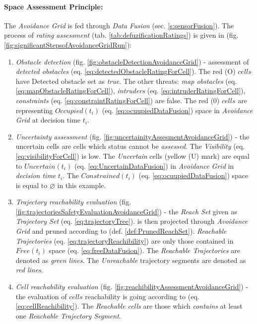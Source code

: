 \paragraph{Space Assessment Principle:} The \emph{Avoidance Grid} is fed through \emph{Data Fusion} (sec. \ref{s:sensorFusion}). The process of \emph{rating assessment} (tab. \ref{tab:defuzificationRatings}) is given in (fig. \ref{fig:significantStepsofAvoidanceGridRun}):
\begin{enumerate}
    \item \emph{Obstacle detection} (fig. \ref{fig:obstacleDetectionAvoidanceGrid}) - assessment of \emph{detected obstacles} (eq. \ref{eq:detectedObstacleRatingForCell}). The red (O) $cells$ have Detected obstacle set as \emph{true}. The other threats: \emph{map obstacles} (eq. \ref{eq:mapObstacleRatingForCell}), \emph{intruders} (eq. \ref{eq:intruderRatingForCell}), \emph{constraints} (eq. \ref{eq:constraintRatingForCell}) are false. The red (0) $cells$ are representing $Occupied(t_i)$ (eq. \ref{eq:ocuupiedDataFusion}) space in \emph{Avoidance Grid} at decision time $t_i$.
    
    \item \emph{Uncertainty assessment} (fig. \ref{fig:uncertainityAssesmentAvoidanceGrid}) - the uncertain cells are cells which status cannot be \emph{assessed}. The \emph{Visibility} (eq. \ref{eq:visibilityForCell}) is low. The \emph{Uncertain} cells (yellow (U) mark) are equal to $Uncertain(t_i)$ (eq. \ref{eq:UncertainDataFusion}) in \emph{Avoidance Grid} in \emph{decision time} $t_i$. The $Constrained(t_i)$ (eq. \ref{eq:ocuupiedDataFusion}) space is equal to $\varnothing$ in this example.
    
    \item \emph{Trajectory reachability evaluation} (fig. \ref{fig:trajectoriesSafetyEvaluationAvoidanceGrid}) - the \emph{Reach Set} given as \emph{Trajectory Set} (eq. \ref{eq:trajectoryTree}). is then projected through \emph{Avoidance Grid} and pruned according to (def. \ref{def:PrunedReachSet}). \emph{Reachable Trajectories} (eq. \ref{eq:trajectoryReachibility}) are only those contained in $Free(t_i)$ space (eq. \ref{eq:freeDataFusion}). The \emph{Reachable Trajectories} are denoted as \emph{green lines}. The \emph{Unreachable} trajectory segments are denoted as \emph{red lines}. 
    
    \item \emph{Cell reachability evaluation} (fig. \ref{fig:reachibilityAssessmentAvoidanceGrid}) - the evaluation of $cells$ reachability is going according to (eq. \ref{eq:cellReachibility}). The \emph{Reachable cells} are those which \emph{contains} at least one \emph{Reachable Trajectory Segment}.
\end{enumerate}



